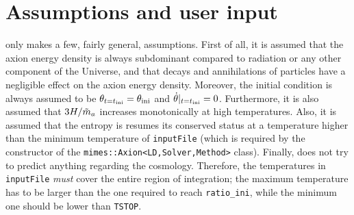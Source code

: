 \documentclass[11pt,a4paper]{article}
\begin{document}
\section{Assumptions and user input}\label{sec:assumptions}
\setcounter{equation}{0}
%
\mimes only makes a few, fairly general, assumptions. First of all, it is assumed that the axion energy density is always subdominant compared to radiation or any other component of the Universe, and that decays and annihilations of particles have a negligible effect on the axion energy density. Moreover, the initial condition is always assumed to be $\theta_{t=t_{\rm ini}{}} = \theta_{\rm ini}{}$ and $\dot \theta|_{t=t_{\rm ini}{}}=0$. 
%
Furthermore, it is also assumed that $3H/\tilde m_{a}{}$ increases monotonically at high temperatures. 
%
Also, it is assumed that the entropy is resumes its conserved status at a temperature higher than the minimum temperature of  {\tt inputFile} (which is required by the constructor of the {\tt mimes::Axion<LD,Solver,Method>} class).  
%
Finally, \mimes does not try to predict anything regarding the cosmology. Therefore, the temperatures in {\tt inputFile} {\em must} cover the entire region of  integration; \ie the maximum temperature has to be larger than the one required to reach {\tt ratio\_ini}, while the minimum one should be lower than {\tt TSTOP}.
\end{document}
